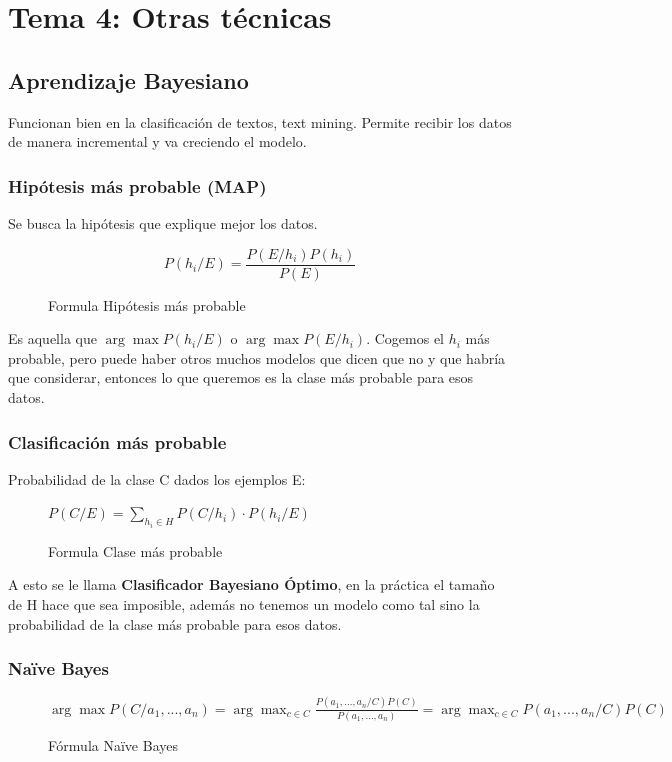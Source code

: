 \documentclass[12pt, twoside, openright]{report} %
\begin{document}
\chapter{Tema 4: Otras técnicas}

\section{Aprendizaje Bayesiano}

Funcionan bien en la clasificación de textos, text mining. Permite
recibir los datos de manera incremental y va creciendo el modelo.

\subsection{Hipótesis más probable
(MAP)}

Se busca la hipótesis que explique mejor los datos.
\begin{figure}[H]
  \[P(h_i/E)= \frac {P(E/h_i)P(h_i)}{P(E)}\]
  \captionsetup{justification=centering}
  \caption{Formula Hipótesis más probable}
\end{figure}

Es aquella que \(\arg \max P(h_i/E)\) o $\arg \max P(E/h_i) $.
Cogemos el \(h_i\) más probable, pero puede haber otros muchos modelos
que dicen que no y que habría que considerar, entonces lo que queremos
es la clase más probable para esos datos.

\subsection{Clasificación más
probable}

Probabilidad de la clase C dados los ejemplos E:
\begin{figure}[H]
  \(P(C/E) = \sum _{h_i \in H} P(C/h_i) \cdot P(h_i/E)\)
  \captionsetup{justification=centering}
  \caption{Formula Clase más probable}
\end{figure}

A esto se le llama \textbf{Clasificador Bayesiano Óptimo}, en la práctica el tamaño de H hace que sea imposible, además no tenemos un modelo como tal sino la probabilidad de la clase más probable para esos datos.

\subsection{Naïve Bayes}

\begin{figure}[H]
  \(\arg \max P(C/a_1, ...,a_n)= \arg \max _{c \in C} \frac {P(a_1, ...,a_n/C)P(C)}{P(a_1, ...,a_n)}=\arg \max_{c \in C} P(a_1, ...,a_n/C)P(C)\)
  \captionsetup{justification=centering}
  \caption{Fórmula Naïve Bayes}
\end{figure}
\end{document}
